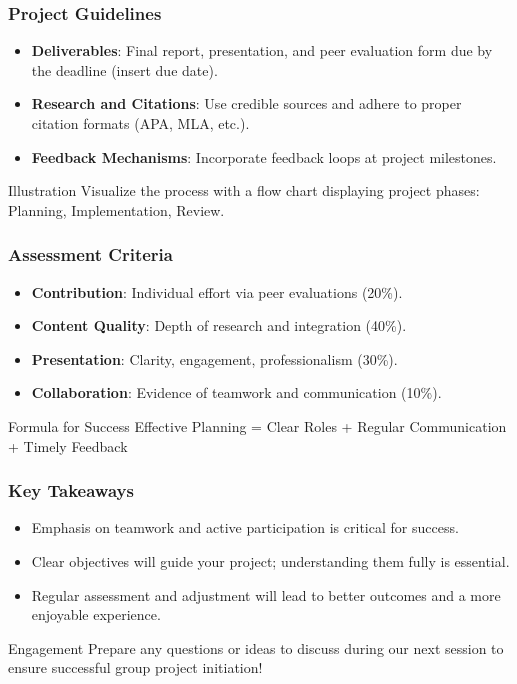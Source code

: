 \documentclass[aspectratio=169]{beamer}
\begin{document}
\begin{frame}[fragile]
    \frametitle{Project Guidelines}
    \begin{itemize}
        \item \textbf{Deliverables}: Final report, presentation, and peer evaluation form due by the deadline (insert due date).
        \item \textbf{Research and Citations}: Use credible sources and adhere to proper citation formats (APA, MLA, etc.).
        \item \textbf{Feedback Mechanisms}: Incorporate feedback loops at project milestones.
    \end{itemize}
    \begin{block}{Illustration}
        Visualize the process with a flow chart displaying project phases: Planning, Implementation, Review.
    \end{block}
\end{frame}

\begin{frame}[fragile]
    \frametitle{Assessment Criteria}
    \begin{itemize}
        \item \textbf{Contribution}: Individual effort via peer evaluations (20\%).
        \item \textbf{Content Quality}: Depth of research and integration (40\%).
        \item \textbf{Presentation}: Clarity, engagement, professionalism (30\%).
        \item \textbf{Collaboration}: Evidence of teamwork and communication (10\%).
    \end{itemize}
    \begin{block}{Formula for Success}
        Effective Planning = Clear Roles + Regular Communication + Timely Feedback
    \end{block}
\end{frame}

\begin{frame}[fragile]
    \frametitle{Key Takeaways}
    \begin{itemize}
        \item Emphasis on teamwork and active participation is critical for success.
        \item Clear objectives will guide your project; understanding them fully is essential.
        \item Regular assessment and adjustment will lead to better outcomes and a more enjoyable experience.
    \end{itemize}
    \begin{block}{Engagement}
        Prepare any questions or ideas to discuss during our next session to ensure successful group project initiation!
    \end{block}
\end{frame}
\end{document}
